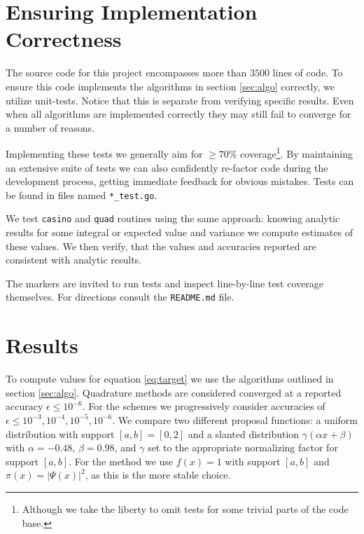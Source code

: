 \documentclass[10pt, a4paper]{article}
\begin{document}
\section{Ensuring Implementation Correctness}
  \label{sec:tests}
  The source code for this project encompasses more than $3500$ lines of code\footnotemark. To ensure
  this code implements the algorithms in section \ref{sec:algo} correctly, we utilize unit-tests.
  Notice that this is separate from verifying specific results. Even when all algorithms are
  implemented correctly they may still fail to converge for a number of reasons\cite{nr}.


  Implementing these tests we generally aim for $\ge 70\%$ coverage\footnote{Although
  we take the liberty to omit tests for some trivial parts of the code base.}. By maintaining an extensive
  suite of tests we can also confidently re-factor code during the development process, getting immediate
  feedback for obvious mistakes. Tests can be found in files named \texttt{*\_test.go}.

  We test \texttt{casino} and \texttt{quad} routines using the same approach: knowing analytic
  results for some integral or expected value and variance we compute estimates
  of these values. We then verify, that the values and accuracies reported are consistent with
  analytic results.

  The markers are invited to run tests and inspect line-by-line test coverage themselves.
  For directions consult the \texttt{README.md} file.

\section{Results}
  \label{sec:results}
  To compute values for equation \ref{eq:target} we use the algorithms outlined in section \ref{sec:algo}.
  Quadrature methods are considered converged at a reported accuracy $\epsilon \le 10^{-6}$.
  For the \is{} schemes we progressively consider accuracies of $\epsilon \le 10^{-3},10^{-4},10^{-5},10^{-6}$.
  We compare two different proposal functions: a uniform distribution with support $[a,b] = [0,2]$ and
  a slanted distribution $\gamma(\alpha x + \beta)$ with $\alpha = -0.48$, $\beta = 0.98$, and
  $\gamma$ set to the appropriate normalizing factor for support $[a,b]$.
  For the \apis{} method we use $f(x) = 1$ with support $[a,b]$ and $\pi(x) = |\Psi(x)|^2$, as this
  is the more stable choice\footnotemark.
\end{document}

